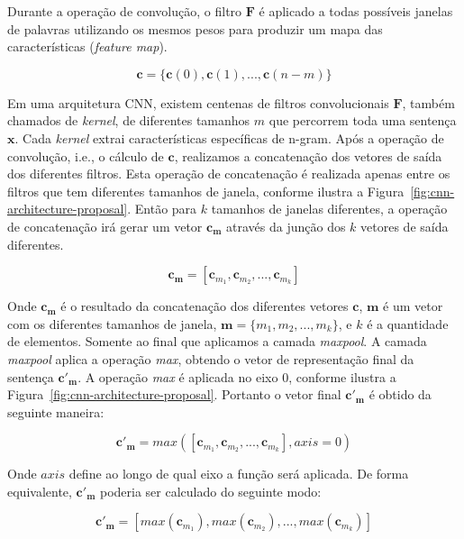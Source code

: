 Durante a operação de convolução, o filtro $\bm{F}$ é aplicado a todas possíveis janelas de palavras utilizando os mesmos pesos para produzir um mapa das características (\textit{feature map}).

\begin{equation}
    \bm{c} = \{ \bm{c}(0), \bm{c}(1), . . ., \bm{c}(n - m) \} 
\end{equation}




Em uma arquitetura CNN, existem centenas de filtros convolucionais $\bm{F}$, também chamados de \textit{kernel}, de diferentes tamanhos $m$ que percorrem toda uma sentença $\bm{x}$. Cada \textit{kernel} extrai características específicas de n-gram. Após a operação de convolução, i.e., o cálculo de $\bm{c}$, realizamos a concatenação dos vetores de saída dos diferentes filtros.
Esta operação de concatenação é realizada apenas entre os filtros que tem diferentes tamanhos de janela, conforme ilustra a Figura~\ref{fig:cnn-architecture-proposal}.
Então para $k$ tamanhos de janelas diferentes, a operação de concatenação irá gerar um vetor $\bm{c}_{\bm{m}}$ através da junção dos $k$ vetores de saída diferentes.

\begin{equation}\label{eq:concatenacao-cnn-cm}
    \bm{c}_{\bm{m}} = \left[\bm{c}_{m_1}, \bm{c}_{m_2}, . . ., \bm{c}_{m_{k}}\right]
\end{equation}

Onde $\bm{c}_{\bm{m}}$ é o resultado da concatenação dos diferentes vetores $\bm{c}$, $\bm{m}$ é um vetor com os diferentes tamanhos de janela, $\bm{m} = \{m_1, m_2, . . ., m_{k}\}$, e $k$ é a quantidade de elementos. Somente ao final que aplicamos a camada \textit{maxpool}. A camada \textit{maxpool} aplica a operação \textit{max}, obtendo o vetor de representação final da sentença $\bm{c'}_{\bm{m}}$. A operação \textit{max} é aplicada no eixo $0$, conforme ilustra a Figura~\ref{fig:cnn-architecture-proposal}. Portanto o vetor final $\bm{c'}_{\bm{m}}$ é obtido da seguinte maneira:

\begin{equation}
    \bm{c'}_{\bm{m}} = max\left(\left[\bm{c}_{m_1}, \bm{c}_{m_2}, . . ., \bm{c}_{m_k}\right], axis = 0\right)
\end{equation}

Onde $axis$ define ao longo de qual eixo a função será aplicada. De forma equivalente, $\bm{c'}_{\bm{m}}$ poderia ser calculado do seguinte modo:

\begin{equation}\label{eq:final_representation_cnn}
    \bm{c'}_{\bm{m}} = \left[max(\bm{c}_{m_1}), max(\bm{c}_{m_2}), . . ., max(\bm{c}_{m_k})\right]
\end{equation}


